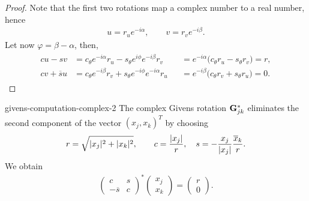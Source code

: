 \begin{proof}
  Note that the first two rotations map a complex number to a real number, hence
  \begin{gather}
    u = r_u e^{-i\alpha}, \qquad v = r_v e^{-i\beta}.
  \end{gather}
  Let now $\varphi = \beta-\alpha$, then,
  \begin{gather}
    \begin{aligned}
      c u - s v
      &= c_\theta e^{-i\alpha} r_u - s_\theta e^{i\phi} e^{-i\beta} r_v
      &&= e^{-i\alpha}\bigl(c_\theta r_u - s_\theta r_v\bigr) = r,
      \\
      c v + \overline s u
      &= c_\theta e^{-i\beta} r_v + s_\theta e^{-i\phi} e^{-i\alpha} r_u
      &&= e^{-i\beta}\bigl(c_\theta r_v + s_\theta r_u\bigr) = 0.
    \end{aligned}
  \end{gather}
\end{proof}

\begin{Lemma}{givens-computation-complex-2}
  The complex Givens rotation $\mathbf G_{jk}^*$ eliminates the second
  component of the vector $(x_j,x_k)^T$ by choosing
  \begin{gather}
    r = \sqrt{\lvert x_j\rvert^2+\lvert x_k\rvert^2},\qquad
    c = \frac{|x_j|}r,\quad s = - \frac{x_j}{|x_j|}\frac{\overline{x}_k}r.
  \end{gather}
  We obtain
  \begin{gather}
    \begin{pmatrix}
      c & s \\ -\overline{s} & c
    \end{pmatrix}^*
    \begin{pmatrix}
      x_j\\x_k
    \end{pmatrix}
    =
    \begin{pmatrix}
      r\\0
    \end{pmatrix}
    .
  \end{gather}
\end{Lemma}

